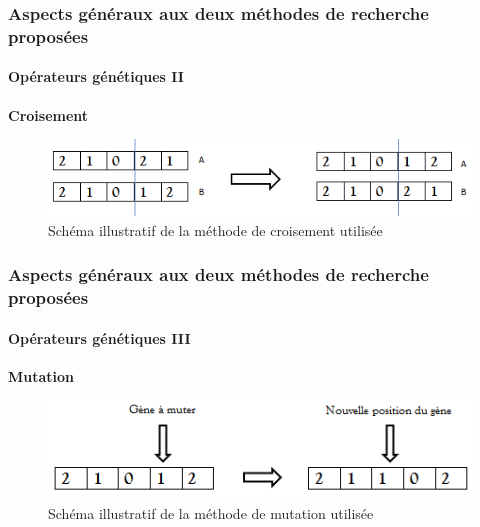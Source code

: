\documentclass[11pt]{beamer}
\begin{document}
 \begin{frame}
 \frametitle{Aspects généraux aux deux méthodes de recherche proposées}
 \framesubtitle{Opérateurs génétiques II}
	
	\textbf{Croisement}
	\begin{figure}[!h]
		\begin{center}
			\includegraphics[scale=.5
			]{img/cross_over_fig.png}
			\caption{Schéma illustratif de la méthode de croisement utilisée}
		\end{center}
 \end{figure}
	
 \end{frame}
 
 \begin{frame}
 \frametitle{Aspects généraux aux deux méthodes de recherche proposées}
 \framesubtitle{Opérateurs génétiques III}
	
	\textbf{Mutation}
	\begin{figure}[!h]
		\begin{center}
			\includegraphics[scale=.5
			]{img/mutation_fig.png}
			\caption{Schéma illustratif de la méthode de mutation utilisée}
		\end{center}
 \end{figure}
	
 \end{frame}
 
\end{document}
